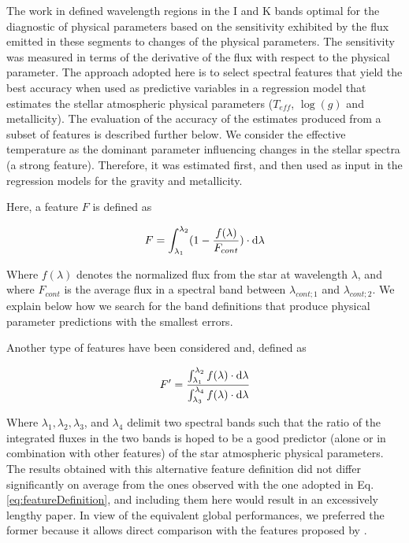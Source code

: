 The work in \cite{cesetti} defined wavelength regions in the I and K
bands optimal for the diagnostic of physical parameters based on the
sensitivity exhibited by the flux emitted in these segments to changes
of the physical parameters. The sensitivity was measured in terms of
the derivative of the flux with respect to the physical parameter. The
approach adopted here is to select spectral features that yield the
best accuracy when used as predictive variables in a regression model
that estimates the stellar atmospheric physical parameters ($T_{eff}$,
$\log(g)$ and metallicity). The evaluation of the accuracy of the
estimates produced from a subset of features is described further
below. 
We consider the effective temperature as the dominant parameter
influencing changes in the stellar spectra (a strong feature). Therefore,
it was estimated first, and then used as input in the regression
models for the gravity and metallicity.

Here, a feature $F$ is defined as

\begin{equation}\label{eq:featureDefinition}
  F = \int_{\lambda_{1}}^{\lambda_{2}} (1-\frac{f(\lambda)}{F_{cont}}) \cdot {\rm d}{\lambda}
\end{equation}

Where $f(\lambda)$ denotes the normalized flux from the star at
wavelength $\lambda$, and where $F_{cont}$ is the average flux in a
spectral band between $\lambda_{cont;1}$ and $\lambda_{cont;2}$. We
explain below how we search for the band definitions that produce
physical parameter predictions with the smallest errors.

Another type of features have been considered and, defined as

\begin{equation}\label{eq:feature2}
  F' = \frac{ \int_{\lambda_{1}}^{\lambda_{2}}f(\lambda) \cdot {\rm d}{\lambda}}
               {\int_{\lambda_{3}}^{\lambda_{4}} f(\lambda) \cdot {\rm d}{\lambda}} 
\end{equation}

Where $\lambda_1, \lambda_2, \lambda_3$, and
$\lambda_4$ delimit two spectral bands such that the ratio of the
integrated fluxes in the two bands is hoped to be a good predictor
(alone or in combination with other features) of the star atmospheric
physical parameters. The results obtained with this alternative
feature definition did not differ significantly on average from the
ones observed with the one adopted in Eq. \ref{eq:featureDefinition},
and including them here would result in an excessively lengthy
paper. In view of the equivalent global performances, we preferred the
former because it allows direct comparison with the features proposed
by \cite{cesetti}.

